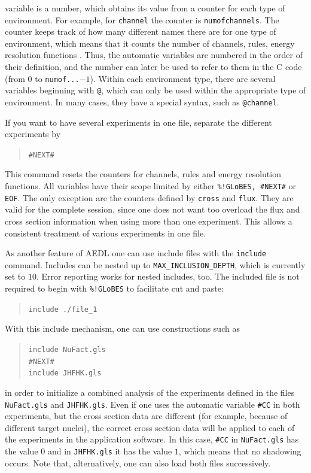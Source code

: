 variable is a number, which obtains its value from a counter for each type of environment. For example, for {\tt channel} the counter is {\tt numofchannels}. The counter keeps track of how many different names 
there are for one type of environment, which means that it counts the number of channels, rules, energy resolution functions \etc . Thus, the automatic
variables are numbered in the order of their definition, and the number
can later be used to refer to them in the C code (from $0$ to {\tt numof...}$-1$). Within each environment type, there are several 
variables beginning with {\tt @}, which can only be used within the 
appropriate type of environment. In many cases, 
they have a special syntax, such as {\tt @channel}.          

If you want to have several experiments in one file, separate the different
 experiments by 
\begin{quote}
{\tt    \#NEXT\#}
\end{quote}
This command resets the counters for channels, rules and energy resolution
functions. All variables have their scope limited 
by either {\tt \%!GLoBES, \#NEXT\#} or {\tt EOF}. The only exception are 
the counters defined by {\tt cross} and {\tt flux}. They are valid for 
the complete session, since one does not want too overload the flux and 
cross section information when using more than one experiment. This allows 
a consistent treatment of various experiments in one file.

As another feature of AEDL one can use include files with the {\tt include} command. Includes can be nested up to {\tt MAX\_INCLUSION\_DEPTH}, which is currently set to $10$. Error reporting works 
 for nested includes, too. The included file is not required to begin 
 with {\tt \%!GLoBES} to facilitate cut and paste:
\begin{quote}
{\tt include ./file\_1}
\end{quote}
With this include mechanism, one can use constructions such as 
\begin{quote}
{\tt    include NuFact.gls\\
        \#NEXT\#\\
        include JHFHK.gls
}
\end{quote}
in order to initialize a combined analysis of the experiments defined in the files {\tt NuFact.gls} and {\tt JHFHK.gls}. 
Even if one uses the
automatic variable {\tt \#CC} in both experiments, 
but the cross section data are different (for example, because of different target nuclei), the correct 
cross section data will be applied to each of the experiments in the 
application software. In this case, {\tt \#CC} in {\tt NuFact.gls} has 
the value $0$ and in {\tt JHFHK.gls} it has the value $1$, 
which means that no shadowing occurs. Note that, alternatively, one can 
also load both files successively. 

